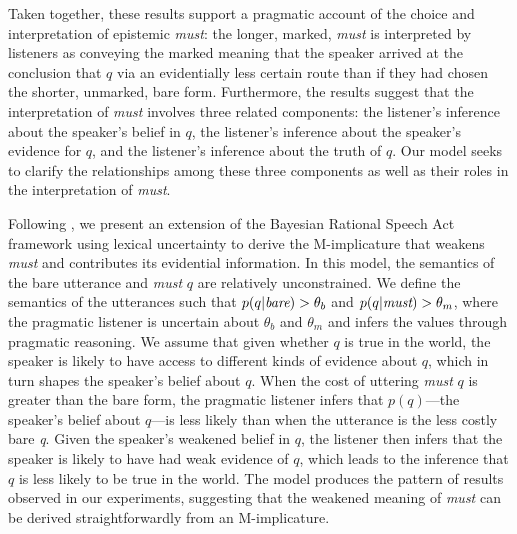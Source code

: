 \documentclass[11pt]{article}
\begin{document}
Taken together, these results support a pragmatic account of the choice and interpretation of epistemic \emph{must}: the longer, marked, \emph{must} is interpreted by listeners as conveying the marked meaning that the speaker arrived at the conclusion that $q$ via an evidentially less certain route than if they had chosen the shorter, unmarked, bare form. Furthermore, the results suggest that the interpretation of \emph{must} involves three related components: the listener's inference about the speaker's belief in $q$, the listener's inference about the speaker's evidence for $q$, and the listener's inference about the truth  of $q$. Our model seeks to clarify the relationships among these three components as well as their roles in the interpretation of \emph{must}. %

Following \citep{lassitergoodman2013}, we present an extension of the Bayesian Rational Speech Act framework  using lexical uncertainty to derive the M-implicature that weakens \emph{must} and contributes its evidential information. In this model,  the semantics of the bare utterance and \emph{must} $q$ are relatively unconstrained. We define the semantics of the utterances such that $p(q | \emph{bare} ) > \theta_b$ and $p(q | \emph{must} ) > \theta_m$, where the pragmatic listener is uncertain about $\theta_b$ and $\theta_m$ and infers the values through pragmatic reasoning. We assume that given whether $q$ is true in the world, the speaker is likely to have access to different kinds of evidence about $q$, which in turn shapes the speaker's belief about $q$. When the cost of uttering \emph{must} $q$ is greater than the bare form, the pragmatic listener infers that $p(q)$---the speaker's belief about $q$---is less likely than when the utterance is the less costly bare \emph{q}.
Given the speaker's weakened belief in $q$, the listener then infers that the speaker is likely to have had weak evidence of $q$, which leads to the inference that $q$ is less likely to be true in the world. The model produces the pattern of results observed in our experiments, suggesting that the weakened meaning of \emph{must} can be derived straightforwardly from an M-implicature.

\end{document}
